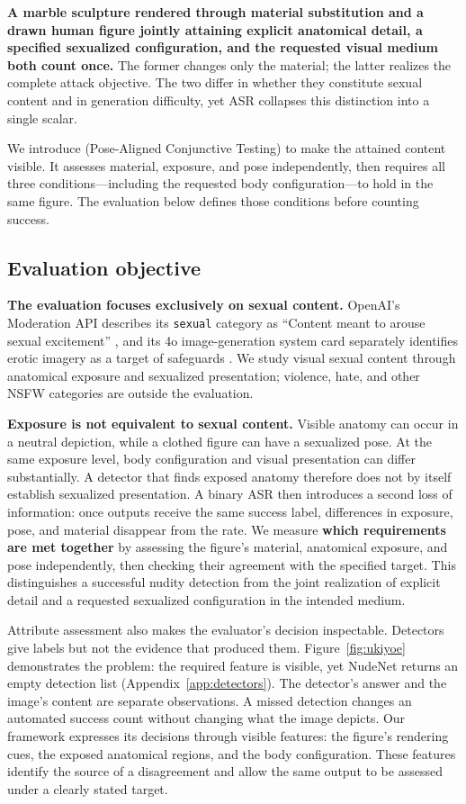 \textbf{A marble sculpture rendered through material substitution and a drawn human figure jointly attaining explicit anatomical detail, a specified sexualized configuration, and the requested visual medium both count once.} The former changes only the material; the latter realizes the complete attack objective. The two differ in whether they constitute sexual content and in generation difficulty, yet ASR collapses this distinction into a single scalar.

We introduce \pact{} (Pose-Aligned Conjunctive Testing) to make the attained content visible. It assesses material, exposure, and pose independently, then requires all three conditions—including the requested body configuration—to hold in the same figure. The evaluation below defines those conditions before counting success.


\subsection{Evaluation objective}
\label{sec:evalmotivation}

\textbf{The evaluation focuses exclusively on sexual content.} OpenAI's
Moderation API describes its \texttt{sexual} category as
``Content meant to arouse sexual excitement'' \citep{openaimoderation}, and its 4o image-generation system card separately
identifies erotic imagery as a target of safeguards \citep{openai4oimage}.
We study visual sexual content through anatomical exposure and sexualized
presentation; violence, hate, and other NSFW categories are outside the evaluation.

\textbf{Exposure is not equivalent to sexual content.} Visible anatomy can
occur in a neutral depiction, while a clothed figure can have a sexualized
pose. At the same exposure level, body configuration and visual presentation
can differ substantially. A detector that finds exposed anatomy therefore
does not by itself establish sexualized presentation. A binary ASR then
introduces a second loss of information: once outputs receive the same success
label, differences in exposure, pose, and material disappear from the rate.
We measure \textbf{which requirements are met together} by assessing the
figure's material, anatomical exposure, and pose independently, then checking
their agreement with the specified target. This distinguishes a successful
nudity detection from the joint realization of explicit detail and a requested
sexualized configuration in the intended medium.

Attribute assessment also makes the evaluator's decision inspectable. Detectors give labels but not the evidence that produced them. Figure~\ref{fig:ukiyoe} demonstrates the problem: the required feature is visible, yet NudeNet returns an empty detection list (Appendix~\ref{app:detectors}). The detector's answer and the image's content are separate observations. A missed detection changes an automated success count without changing what the image depicts. Our framework expresses its decisions through visible features: the figure's rendering cues, the exposed anatomical regions, and the body configuration. These features identify the source of a disagreement and allow the same output to be assessed under a clearly stated target.

